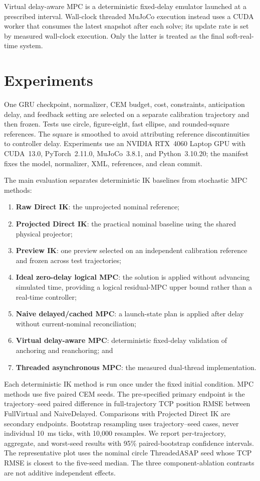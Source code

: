 \documentclass[conference]{IEEEtran}
\begin{document}
Virtual delay-aware MPC is a deterministic fixed-delay emulator launched at a prescribed interval. Wall-clock threaded MuJoCo execution instead uses a CUDA worker that consumes the latest snapshot after each solve; its update rate is set by measured wall-clock execution. Only the latter is treated as the final soft-real-time system.

\section{Experiments}
\label{sec:protocol}
One GRU checkpoint, normalizer, CEM budget, cost, constraints, anticipation delay, and feedback setting are selected on a separate calibration trajectory and then frozen. Tests use circle, figure-eight, fast ellipse, and rounded-square references. The square is smoothed to avoid attributing reference discontinuities to controller delay. Experiments use an NVIDIA RTX~4060 Laptop GPU with CUDA~13.0, PyTorch~2.11.0, MuJoCo~3.8.1, and Python~3.10.20; the manifest fixes the model, normalizer, XML, references, and clean commit.

The main evaluation separates deterministic IK baselines from stochastic MPC methods:
\begin{enumerate}
 \item \textbf{Raw Direct IK}: the unprojected nominal reference;
 \item \textbf{Projected Direct IK}: the practical nominal baseline using the shared physical projector;
 \item \textbf{Preview IK}: one preview selected on an independent calibration reference and frozen across test trajectories;
 \item \textbf{Ideal zero-delay logical MPC}: the solution is applied without advancing simulated time, providing a logical residual-MPC upper bound rather than a real-time controller;
 \item \textbf{Naive delayed/cached MPC}: a launch-state plan is applied after delay without current-nominal reconciliation;
 \item \textbf{Virtual delay-aware MPC}: deterministic fixed-delay validation of anchoring and reanchoring; and
 \item \textbf{Threaded asynchronous MPC}: the measured dual-thread implementation.
\end{enumerate}
Each deterministic IK method is run once under the fixed initial condition. MPC methods use five paired CEM seeds. The pre-specified primary endpoint is the trajectory--seed paired difference in full-trajectory TCP position RMSE between FullVirtual and NaiveDelayed. Comparisons with Projected Direct IK are secondary endpoints. Bootstrap resampling uses trajectory--seed cases, never individual 10~ms ticks, with 10,000 resamples. We report per-trajectory, aggregate, and worst-seed results with 95\% paired-bootstrap confidence intervals. The representative plot uses the nominal circle ThreadedASAP seed whose TCP RMSE is closest to the five-seed median. The three component-ablation contrasts are not additive independent effects.
\end{document}
